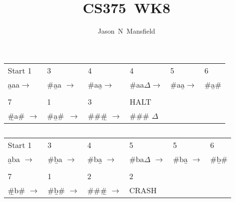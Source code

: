 \documentclass[10pt]{article}
\title{CS375~WK8}
\author{Jason~N~Mansfield}
\begin{document}
\section{}
\subsection{}

\begin{tabular}{ l l l l l l }  
  Start 1&3&4&4&5&6           \\         
\b{a}aa$\rightarrow$ & \#\b{a}a $\rightarrow$&\#a\b{a}$\rightarrow$ & \#aa\b{$\Delta$}$\rightarrow$& \#a\b{a}$\rightarrow$&\#\b{a}\#\\
&&&&&\\%
7&1&3&HALT&&\\
\b{\#}a\# $\rightarrow$&\#\b{a}\#\ $\rightarrow$&\#\#\b{\#} $\rightarrow$ & \#\#\# \b{$\Delta$} &&\\
\end{tabular}

\subsection{}
\begin{tabular}{l l l l l l}
Start 1& 3 & 4 & 5 & 5 & 6\\
\b{a}ba $\rightarrow$& \#\b{b}a $\rightarrow$& \#b\b{a} $\rightarrow$ & \#ba\b{$\Delta$} $\rightarrow$ & \#b\b{a} $\rightarrow$& \#\b{b}\# \\
&&&&&\\
7&1& 2 &2&&\\
\b{\#}b\# $\rightarrow$& \#\b{b}\# $\rightarrow$& \#\#\b{\#} $\rightarrow$&CRASH&&

\end{tabular}
\end{document}
